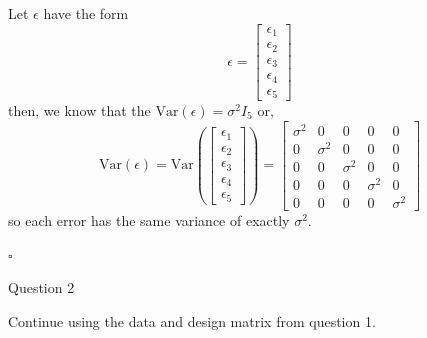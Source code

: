 \documentclass[12pt,letterpaper, onecolumn]{exam}
\begin{document}
\begin{questions}
\begin{solution}
\begin{enumerate}[A.)]
\begin{enumerate}[i.)]
            Let $\epsilon$ have the form
            \begin{equation*}
                \epsilon = \left[\begin{array}{c}
                \epsilon_1  \\
                \epsilon_2  \\
                \epsilon_3  \\
                \epsilon_4  \\
                \epsilon_5 
            \end{array} \right]
            \end{equation*}
            then, we know that the $\text{Var}(\epsilon)=\sigma^2I_5$ or,
            \begin{equation*}
               \text{Var}(\epsilon)= \text{Var}\left(\left[\begin{array}{c}
                \epsilon_1  \\
                \epsilon_2  \\
                \epsilon_3  \\
                \epsilon_4  \\
                \epsilon_5 
            \end{array} \right] \right) = \left [\begin{array}{ccccc}
                \sigma^2 & 0 & 0 & 0 & 0 \\ 0 & \sigma^2 & 0 & 0 & 0 \\
                0 & 0 & \sigma^2 & 0 & 0 \\ 0 & 0 & 0 & \sigma^2 & 0 \\
                0 & 0 & 0 & 0 & \sigma^2
            \end{array} \right]
            \end{equation*}
            so each error has the same variance of exactly $\sigma^2$.
            \end{enumerate}
    \end{enumerate}

        $\square$
    \end{solution}

    \newpage
    \question[12] Question 2\droppoints

    Continue using the data and design matrix from question 1.


\end{questions}
\end{document}
